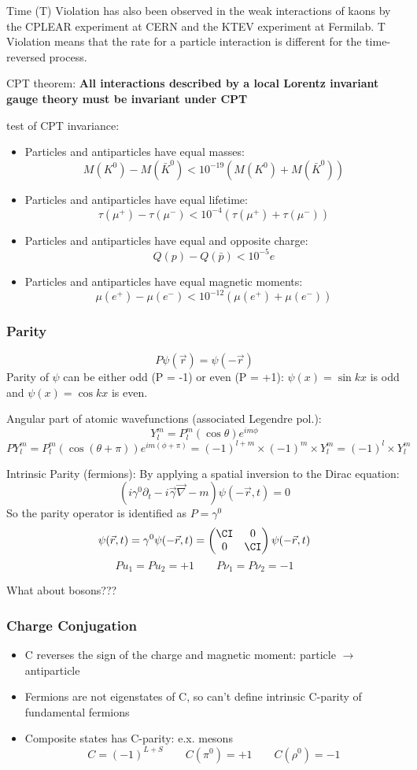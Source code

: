 Time (T) Violation has also been observed in the weak interactions of kaons by 
the CPLEAR experiment at CERN and the KTEV experiment at Fermilab. T Violation 
means that the rate for a particle interaction is different for the time-reversed process.

CPT theorem:
\textbf{All interactions described by a local Lorentz invariant gauge theory
must be invariant under CPT}

test of CPT invariance:
\begin{itemize}
    \item Particles and antiparticles have equal masses:
	$$ M(K^0) - M(\bar{K}^0) < 10^{-19} (M(K^0) + M(\bar{K}^0)) $$
    \item Particles and antiparticles have equal lifetime:
	$$ \tau(\mu^+) - \tau(\mu^-) < 10^{-4} (\tau(\mu^+) + \tau(\mu^-)) $$
    \item Particles and antiparticles have equal and opposite charge:
	$$ Q(p) - Q(\bar{p}) < 10^{-5} e $$
    \item Particles and antiparticles have equal magnetic moments:
	$$ \mu(e^+) - \mu(e^-) < 10^{-12} (\mu(e^+) + \mu(e^-)) $$
\end{itemize}
\subsubsection{Parity}
$$ P\psi(\vec{r}) = \psi(-\vec{r}) $$
Parity of $\psi$ can be either odd (P = -1) or even (P = +1):
$\psi(x) = \sin kx $ is odd and $\psi(x) = \cos kx$ is even.

Angular part of atomic wavefunctions (associated Legendre pol.):
$$ Y_l^m = P_l^m(\cos\theta) e^{im\phi} $$
$$ PY_l^m = P_l^m(\cos(\theta + \pi)) e^{im(\phi + \pi)} = (-1)^{l+m} \times (-1)^m \times Y_l^m = (-1)^l \times Y_l^m $$

Intrinsic Parity (fermions):
By applying a spatial inversion to the Dirac equation:
$$ \left( i\gamma^0\partial_t -i\vec{\gamma}\vec{\nabla} - m\right)\psi(-\vec{r}, t) = 0 $$
So the parity operator is identified as $P = \gamma^0$
$$ \psi(\vec{r}, t) =  \gamma^0\psi(-\vec{r}, t) = \begin{pmatrix} \CI & 0\\ 0 & \CI \\ \end{pmatrix} \psi(-\vec{r}, t) $$
$$ Pu_1 = Pu_2 = +1 \qquad P\nu_1 = P\nu_2 = -1 $$

What about bosons???
\subsubsection{Charge Conjugation}
\begin{itemize}
    \item C reverses the sign of the charge and magnetic moment: particle $\rightarrow$ antiparticle
    \item Fermions are not eigenstates of C, so can't define intrinsic C-parity of fundamental fermions
    \item Composite states has C-parity: e.x. mesons
	$$ C = (-1)^{L+S} \qquad C(\pi^0) = +1 \qquad C(\rho^0) = -1 $$
\end{itemize}

